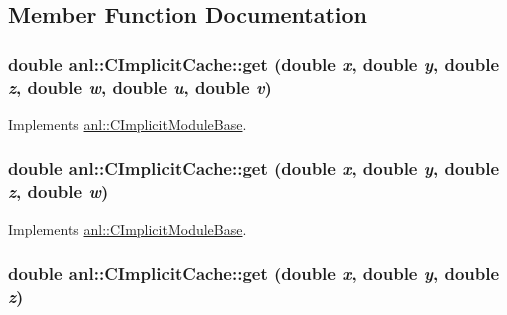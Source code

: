 \subsection{Member Function Documentation}
\hypertarget{classanl_1_1CImplicitCache_ab7cae239c57e693521e2038461a2f5bb}{
\subsubsection[{get}]{\setlength{\rightskip}{0pt plus 5cm}double anl::CImplicitCache::get (double {\em x}, \/  double {\em y}, \/  double {\em z}, \/  double {\em w}, \/  double {\em u}, \/  double {\em v})}}
\label{classanl_1_1CImplicitCache_ab7cae239c57e693521e2038461a2f5bb}


Implements \hyperlink{classanl_1_1CImplicitModuleBase_aa40b7d54572197612a4fea44b63447eb}{anl::CImplicitModuleBase}.\hypertarget{classanl_1_1CImplicitCache_a0f5dff0ad736097091e6c02272701393}{
\subsubsection[{get}]{\setlength{\rightskip}{0pt plus 5cm}double anl::CImplicitCache::get (double {\em x}, \/  double {\em y}, \/  double {\em z}, \/  double {\em w})}}
\label{classanl_1_1CImplicitCache_a0f5dff0ad736097091e6c02272701393}


Implements \hyperlink{classanl_1_1CImplicitModuleBase_a3cf520bdab59631864253c03b4e1723f}{anl::CImplicitModuleBase}.\hypertarget{classanl_1_1CImplicitCache_aaf9fc4aff6c39b2e0815d6c285dc478f}{
\subsubsection[{get}]{\setlength{\rightskip}{0pt plus 5cm}double anl::CImplicitCache::get (double {\em x}, \/  double {\em y}, \/  double {\em z})}}
\label{classanl_1_1CImplicitCache_aaf9fc4aff6c39b2e0815d6c285dc478f}


